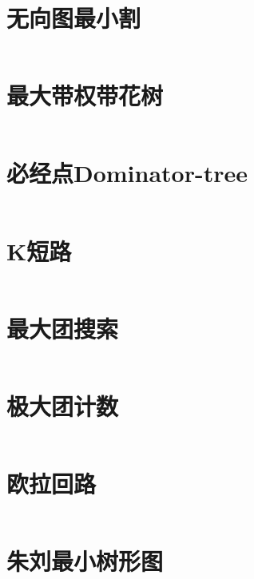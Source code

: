 \section{无向图最小割}
\inputminted{cpp}{\source/graph-theory/StoerWagner_O(V^3).cpp}
\section{最大带权带花树}
\inputminted{cpp}{\source/graph-theory/weighted_blossom.cpp}
\section{必经点Dominator-tree}
\inputminted{cpp}{\source/graph-theory/dominator.cpp}
\section{K短路}
\inputminted{cpp}{\source/graph-theory/Kth-minimum-path.cpp}
\section{最大团搜索}
\inputminted{cpp}{\source/graph-theory/最大团搜索.cpp}
\section{极大团计数}
\inputminted{cpp}{\source/graph-theory/极大团计数.cpp}
\section{欧拉回路}
\inputminted{cpp}{\source/graph-theory/euler-tour.cpp}
\section{朱刘最小树形图}
\inputminted{cpp}{\source/graph-theory/minimum_arborescence.cpp}
